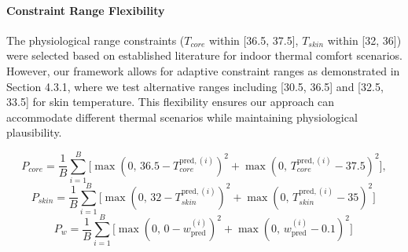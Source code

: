 \begin{enumerate}
\paragraph{Constraint Range Flexibility} The physiological range constraints ($T_{core}$ within [36.5, 37.5], $T_{skin}$ within [32, 36]) were selected based on established literature for indoor thermal comfort scenarios. However, our framework allows for adaptive constraint ranges as demonstrated in Section 4.3.1, where we test alternative ranges including [30.5, 36.5] and [32.5, 33.5] for skin temperature. This flexibility ensures our approach can accommodate different thermal scenarios while maintaining physiological plausibility.

\begin{equation}
    P_{core} = \frac{1}{B} \sum_{i=1}^{B} \Big[ \max(0,\, 36.5 - T_{core}^{\text{pred},(i)})^2 + \max(0,\, T_{core}^{\text{pred},(i)} - 37.5)^2 \Big],
    \label{eq:p_core}
    \end{equation}
\begin{equation}
    P_{skin} = \frac{1}{B} \sum_{i=1}^{B} \Big[ \max(0,\, 32 - T_{skin}^{\text{pred},(i)})^2 + \max(0,\, T_{skin}^{\text{pred},(i)} - 35)^2 \Big] \,
    \label{eq:p_skin}
    \end{equation}
\begin{equation}
     P_{w} = \frac{1}{B} \sum_{i=1}^{B} \Big[ \max(0,\, 0 - w_{\text{pred}}^{(i)})^2 + \max(0,\, w_{\text{pred}}^{(i)} - 0.1)^2 \Big] \,
    \label{eq:p_w}
    \end{equation}


\end{enumerate}
